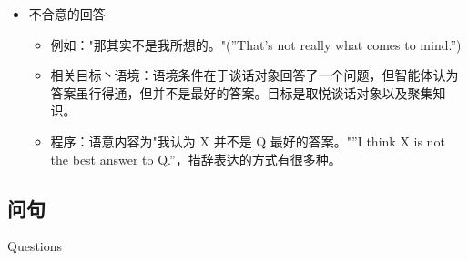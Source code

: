 \begin{itemize}
\item 不合意的回答
\begin{itemize}
\item 例如："那其实不是我所想的。"(”That’s not really what comes to mind.”) 
\item 相关目标丶语境：语境条件在于谈话对象回答了一个问题，但智能体认为答案虽行得通，但并不是最好的答案。目标是取悦谈话对象以及聚集知识。
\item 程序：语意内容为"我认为 X 并不是 Q 最好的答案。"”I think X is not the best answer to Q.”，措辞表达的方式有很多种。
\end{itemize}


\end{itemize}

\subsection{问句}{Questions}

